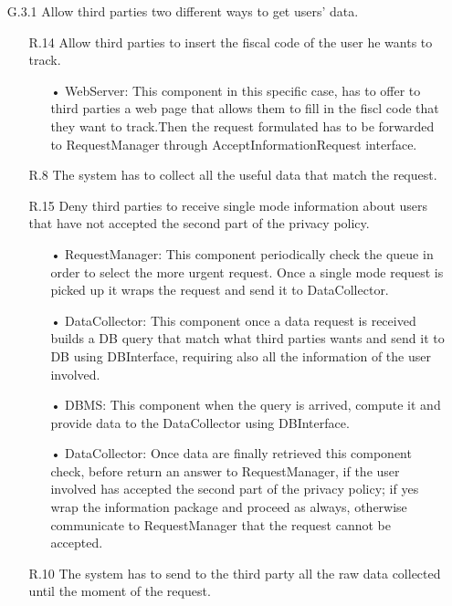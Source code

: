\begin{enumerate}
\item [G.3.1] Allow third parties two different ways to get users’ data.
	\begin{enumerate}
	\item [R.14] Allow third parties to insert the fiscal code of the user he wants to track.
		\begin{enumerate}
		\item[•] WebServer: This component in this specific case, has to offer to third parties a web page that allows them to fill in the fiscl code that they want to track.Then the request formulated has to be forwarded to RequestManager through AcceptInformationRequest interface.
		\end{enumerate}	
		
		\item [R.8] The system has to collect all the useful data that match the request.
	\item [R.15] Deny third parties to receive single mode information about users that have not accepted the second part of the privacy policy.
		\begin{enumerate}
		\item[•] RequestManager: This component periodically check the queue in order to select the more urgent request. Once a single mode request is picked up it wraps the request and send it to DataCollector.
		\item[•] DataCollector: This component once a data request is received builds a DB query that match what third parties wants and send it to DB using DBInterface, requiring also all the information of the user involved.
		\item[•] DBMS: This component when the query is arrived, compute it and provide data to the DataCollector using DBInterface.
		\item[•] DataCollector: Once data are finally retrieved this component check, before return an answer to RequestManager, if the user involved has accepted the second part of the privacy policy; if yes wrap the information package and proceed as always, otherwise communicate to RequestManager that the request cannot be accepted.
		\end{enumerate}	
		
	\item [R.10] The system has to send to the third party all the raw data collected until the moment of the request.
	\end{enumerate}
	

\end{enumerate}
